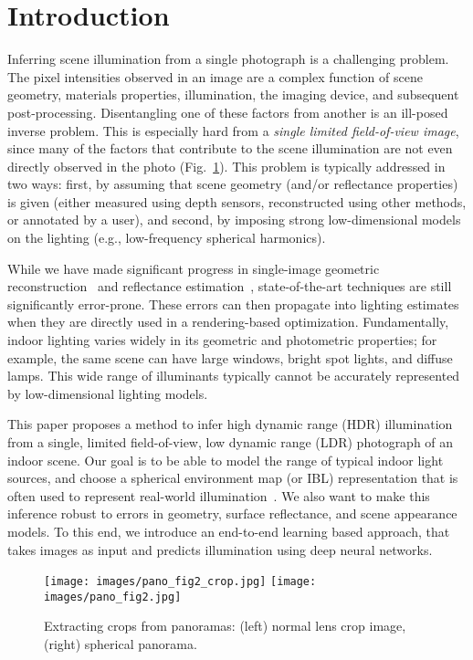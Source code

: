 \section{Introduction}
\label{sec:introduction}

Inferring scene illumination from a single photograph is a challenging problem. The pixel intensities observed in an image are a complex function of scene geometry, materials properties, illumination, the imaging device, and subsequent post-processing. Disentangling one of these factors from another is an ill-posed inverse problem. This is especially hard from a \emph{single limited field-of-view image}, since many of the factors that contribute to the scene illumination are not even directly observed in the photo (Fig.~\ref{f:makethepoint}). This problem is typically addressed in two ways: first, by assuming that scene geometry (and/or reflectance properties) is given (either measured using depth sensors, reconstructed using other methods, or annotated by a user), and second, by imposing strong low-dimensional models on the lighting (e.g., low-frequency spherical harmonics). 

While we have made significant progress in single-image geometric reconstruction~\cite{eigen-iccv-15,bansal2016marr} and reflectance estimation~\cite{bell2015minc,zhou2015intrinsic}, state-of-the-art techniques are still significantly error-prone. These errors can then propagate into lighting estimates when they are directly used in a rendering-based optimization. Fundamentally, indoor lighting varies widely in its geometric and photometric properties; for example, the same scene can have large windows, bright spot lights, and diffuse lamps. This wide range of illuminants typically cannot be accurately represented by low-dimensional lighting models. 

This paper proposes a method to infer high dynamic range (HDR) illumination from a single, limited field-of-view, low dynamic range (LDR) photograph of an indoor scene. Our goal is to be able to model the range of typical indoor light sources, and choose a spherical environment map (or IBL) representation that is often used to represent real-world illumination~\cite{debevec-sig-98}. We also want to make this inference robust to errors in geometry, surface reflectance, and scene appearance models. To this end, we introduce an end-to-end learning based approach, that takes images as input and predicts illumination using deep neural networks.

\begin{figure}[!t]
\centering
\texttt{[image: images/pano\_fig2\_crop.jpg]}
\texttt{[image: images/pano\_fig2.jpg]}
\caption{Extracting crops from panoramas: (left) normal lens crop image, (right) spherical panorama.}
\label{f:makethepoint}
\vspace{-.5em}
\end{figure}

